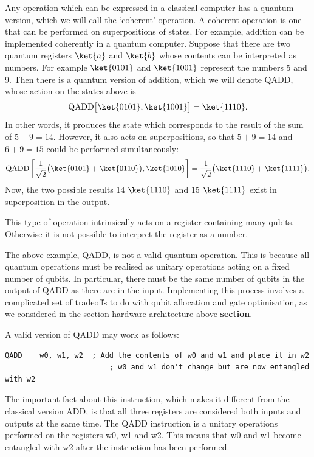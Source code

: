 Any operation which can be expressed in a classical computer has a quantum version, which we will call the `coherent' operation. A coherent operation is one that can be performed on superpositions of states. For example, addition can be implemented coherently in a quantum computer. Suppose that there are two quantum registers $\ket{a}$ and $\ket{b}$ whose contents can be interpreted as numbers. For example $\ket{0101}$ and $\ket{1001}$ represent the numbers 5 and 9. Then there is a quantum version of addition, which we will denote QADD, whose action on the states above is $$\text{QADD}\big[\ket{0101},\ket{1001}\big]=\ket{1110}.$$ In other words, it produces the state which corresponds to the result of the sum of $5 + 9 = 14$. However, it also acts on superpositions, so that $5 + 9 = 14$ and $6 + 9 = 15$ could be performed simultaneously: $$\text{QADD}\left[\frac{1}{\sqrt{2}}\big(\ket{0101}+\ket{0110}\big),\ket{1010}\right]=\frac{1}{\sqrt{2}}\big(\ket{1110}+\ket{1111}\big).$$ Now, the two possible results 14 $\ket{1110}$ and 15 $\ket{1111}$ exist in superposition in the output.

This type of operation intrinsically acts on a register containing many qubits. Otherwise it is not possible to interpret the register as a number.

The above example, QADD, is not a valid quantum operation. This is because all quantum operations must be realised as unitary operations acting on a fixed number of qubits. In particular, there must be the same number of qubits in the output of QADD as there are in the input. Implementing this process involves a complicated set of tradeoffs to do with qubit allocation and gate optimisation, as we considered in the section hardware architecture above \textbf{section}.

A valid version of QADD may work as follows:
\begin{lstlisting}[language=Asm]
    QADD    w0, w1, w2  ; Add the contents of w0 and w1 and place it in w2
                        ; w0 and w1 don't change but are now entangled with w2
\end{lstlisting}

The important fact about this instruction, which makes it different from the classical version ADD, is that all three registers are considered both inputs and outputs at the same time. The QADD instruction is a unitary operations performed on the registers w0, w1 and w2. This means that w0 and w1 become entangled with w2 after the instruction has been performed.

